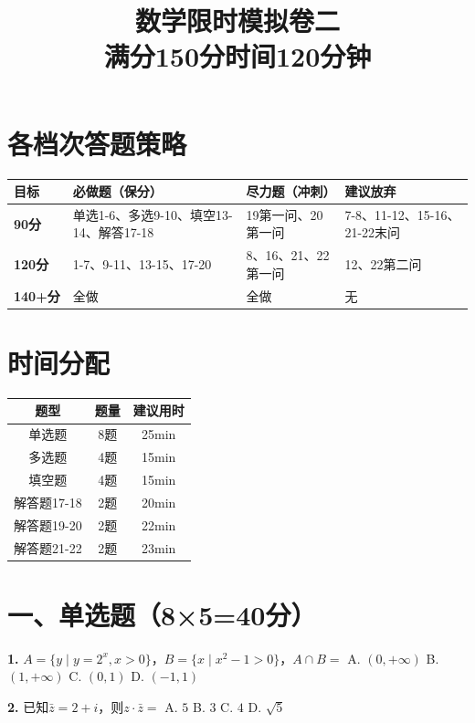\documentclass[12pt,a4paper]{ctexart}
\title{\textbf{数学限时模拟卷二}\\[5pt]\large 满分150分\quad 时间120分钟}
\date{}
\begin{document}
\maketitle

\section*{各档次答题策略}
\begin{center}
\begin{tabular}{p{2.5cm}|p{4cm}|p{4cm}|p{4cm}}
\textbf{目标} & \textbf{必做题（保分）} & \textbf{尽力题（冲刺）} & \textbf{建议放弃} \\ \hline
\textbf{90分} & 单选1-6、多选9-10、填空13-14、解答17-18 & 19第一问、20第一问 & 7-8、11-12、15-16、21-22末问 \\ \hline
\textbf{120分} & 1-7、9-11、13-15、17-20 & 8、16、21、22第一问 & 12、22第二问 \\ \hline
\textbf{140+分} & 全做 & 全做 & 无 \\
\end{tabular}
\end{center}

\section*{时间分配}
\begin{center}
\begin{tabular}{c|c|c}
题型 & 题量 & 建议用时 \\ \hline
单选题 & 8题 & 25min \\
多选题 & 4题 & 15min \\
填空题 & 4题 & 15min \\
解答题17-18 & 2题 & 20min \\
解答题19-20 & 2题 & 22min \\
解答题21-22 & 2题 & 23min \\
\end{tabular}
\end{center}

\section*{一、单选题（8×5=40分）}

\textbf{1.} $A=\{y\mid y=2^x,x>0\}$，$B=\{x\mid x^2-1>0\}$，$A\cap B=$
A. $(0,+\infty)$ \quad B. $(1,+\infty)$ \quad C. $(0,1)$ \quad D. $(-1,1)$

\textbf{2.} 已知$\bar{z}=2+i$，则$z\cdot\bar{z}=$
A. $5$ \quad B. $3$ \quad C. $4$ \quad D. $\sqrt5$
\end{document}

